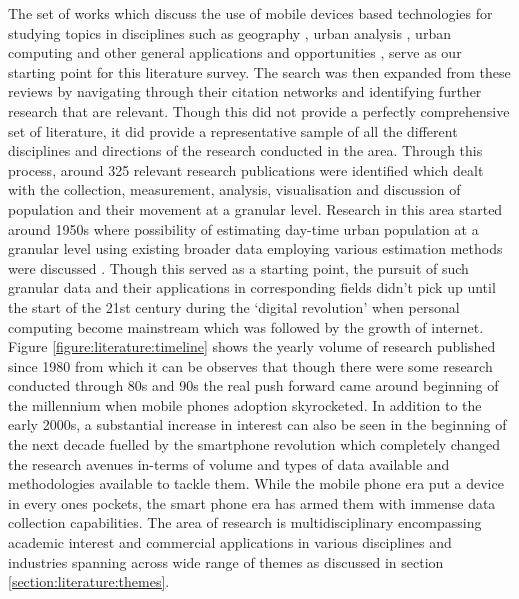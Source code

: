 The set of works which discuss the use of mobile devices based technologies for studying topics in disciplines such as geography \citet{li2016}, urban analysis \citep{ratti2006}, urban computing \citep{jiang2013} and other general applications and opportunities \citep{steenbruggen2013, arribas-bel2014}, serve as our starting point for this literature survey.
The search was then expanded from these reviews by navigating through their citation networks and identifying further research that are relevant.
Though this did not provide a perfectly comprehensive set of literature, it did provide a representative sample of all the different disciplines and directions of the research conducted in the area.
Through this process, around 325 relevant research publications were identified which dealt with the collection, measurement, analysis, visualisation and discussion of population and their movement at a granular level.
Research in this area started around 1950s where possibility of estimating day-time urban population at a granular level using existing  broader data employing various estimation methods were discussed \cite{foley1954, schmitt1956}.
Though this served as a starting point, the pursuit of such granular data and their applications in corresponding fields didn't pick up until the start of the 21st century during the `digital revolution' when personal computing become mainstream which was followed by the growth of internet.
Figure \ref{figure:literature:timeline} shows the yearly volume of research published since 1980 from which it can be observes that though there were some research conducted through 80s and 90s the real push forward came around beginning of the millennium when mobile phones adoption skyrocketed.
In addition to the early 2000s, a substantial increase in interest can also be seen in the beginning of the next decade fuelled by the smartphone revolution which completely changed the research avenues in-terms of volume and types of data available and methodologies available to tackle them.
While the mobile phone era put a device in every ones pockets, the smart phone era has armed them with immense data collection capabilities.
The area of research is multidisciplinary encompassing academic interest and commercial applications in various disciplines and industries spanning across wide range of themes as discussed in section \ref{section:literature:themes}.


 




